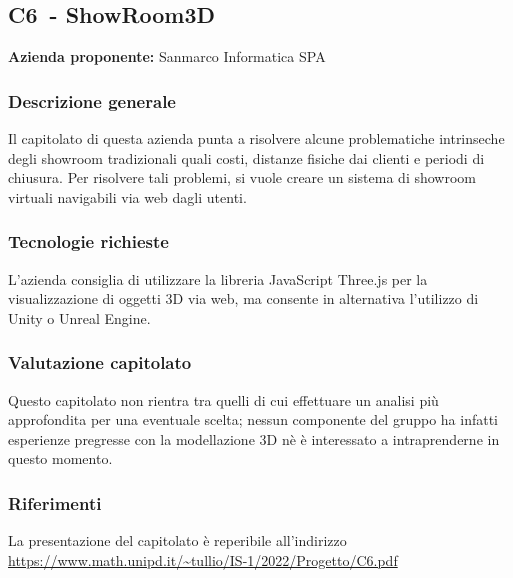
\renewcommand{\capName}{ShowRoom3D} %
\renewcommand{\capCode}{C6} %
\renewcommand{\capLink}{https://www.math.unipd.it/~tullio/IS-1/2022/Progetto/C6.pdf} %
\renewcommand{\capProposer}{SanMarco Informatica} %


\subsection{\capCode\ - \capName}
\textbf{Azienda proponente:} Sanmarco Informatica SPA
\subsubsection{Descrizione generale}
Il capitolato di questa azienda punta a risolvere alcune problematiche intrinseche degli showroom tradizionali quali costi, distanze fisiche dai clienti e periodi di chiusura. Per risolvere tali problemi, si vuole creare un sistema di showroom virtuali navigabili via web dagli utenti.

\subsubsection{Tecnologie richieste}
L'azienda consiglia di utilizzare la libreria JavaScript Three.js per la visualizzazione di oggetti 3D via web, ma consente in alternativa l'utilizzo di Unity o Unreal Engine.

\subsubsection{Valutazione capitolato}
Questo capitolato non rientra tra quelli di cui effettuare un analisi più approfondita per una eventuale scelta; nessun componente del gruppo ha infatti esperienze pregresse con la modellazione 3D nè è interessato a intraprenderne in questo momento.

\subsubsection{Riferimenti}
La presentazione del capitolato è reperibile all'indirizzo \url{\capLink} \hfill{}